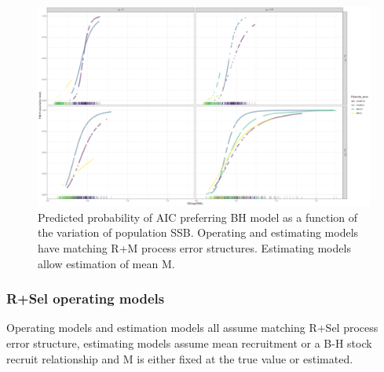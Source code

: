 \documentclass[
  12pt,
]{article}
\begin{document}
\begin{figure}
\caption{Predicted probability of AIC preferring BH model as a function of the variation of population SSB. Operating and estimating models have matching R+M process error structures. Estimating models allow estimation of mean M.}\label{M_om_ME_BH_glm_AIC_plots}
\begin{center}
\includegraphics[width = \textwidth]{M_om_ME_pred_BH_best.png}
\end{center}
\end{figure}

\hypertarget{rsel-operating-models-1}{%
\subsubsection{R+Sel operating models}\label{rsel-operating-models-1}}

\begin{table}
\caption{Operating models and estimation models all assume matching R+Sel process error structure, estimating models assume mean recruitment or a B-H stock recruit relationship and M is either fixed at the true value or estimated.}
{}
\end{table}
\end{document}
